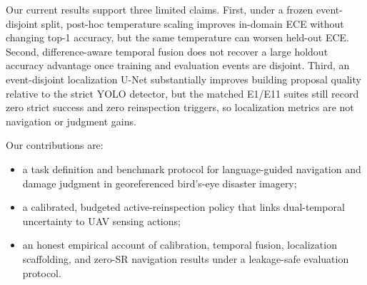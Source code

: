 Our current results support three limited claims.
First, under a frozen event-disjoint split, post-hoc temperature scaling improves in-domain ECE without changing top-1 accuracy, but the same temperature can worsen held-out ECE.
Second, difference-aware temporal fusion does not recover a large holdout accuracy advantage once training and evaluation events are disjoint.
Third, an event-disjoint localization U-Net substantially improves building proposal quality relative to the strict YOLO detector, but the matched E1/E11 suites still record zero strict success and zero reinspection triggers, so localization metrics are not navigation or judgment gains.

Our contributions are:
\begin{itemize}
    \item a task definition and benchmark protocol for language-guided navigation and damage judgment in georeferenced bird's-eye disaster imagery;
    \item a calibrated, budgeted active-reinspection policy that links dual-temporal uncertainty to UAV sensing actions;
    \item an honest empirical account of calibration, temporal fusion, localization scaffolding, and zero-SR navigation results under a leakage-safe evaluation protocol.
\end{itemize}
